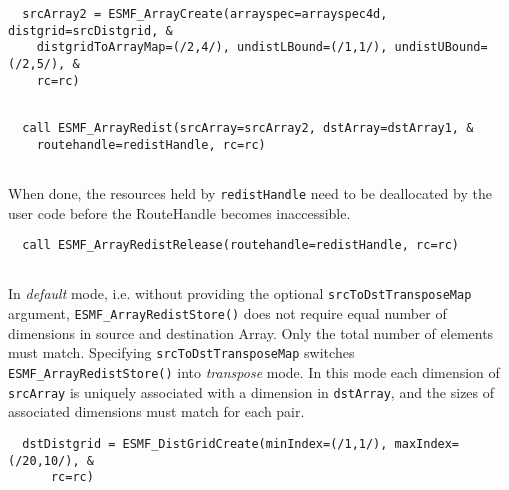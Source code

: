 
 \begin{verbatim}
  srcArray2 = ESMF_ArrayCreate(arrayspec=arrayspec4d, distgrid=srcDistgrid, &
    distgridToArrayMap=(/2,4/), undistLBound=(/1,1/), undistUBound=(/2,5/), &
    rc=rc)
 
\end{verbatim}
 

 \begin{verbatim}
  call ESMF_ArrayRedist(srcArray=srcArray2, dstArray=dstArray1, &
    routehandle=redistHandle, rc=rc)
 
\end{verbatim}
 

   When done, the resources held by {\tt redistHandle} need to be deallocated
   by the user code before the RouteHandle becomes inaccessible. 

 \begin{verbatim}
  call ESMF_ArrayRedistRelease(routehandle=redistHandle, rc=rc)
 
\end{verbatim}
 

   \begin{sloppypar}
   In {\em default} mode, i.e. without providing the optional
   {\tt srcToDstTransposeMap} argument, {\tt ESMF\_ArrayRedistStore()} does not
   require equal number of dimensions in source and destination Array. Only the
   total number of elements must match.
   Specifying {\tt srcToDstTransposeMap} switches {\tt ESMF\_ArrayRedistStore()}
   into {\em transpose} mode. In this mode each dimension of {\tt srcArray}
   is uniquely associated with a dimension in {\tt dstArray}, and the sizes of 
   associated dimensions must match for each pair.
   \end{sloppypar}
    

 \begin{verbatim}
  dstDistgrid = ESMF_DistGridCreate(minIndex=(/1,1/), maxIndex=(/20,10/), &
      rc=rc)
 
\end{verbatim}
 
